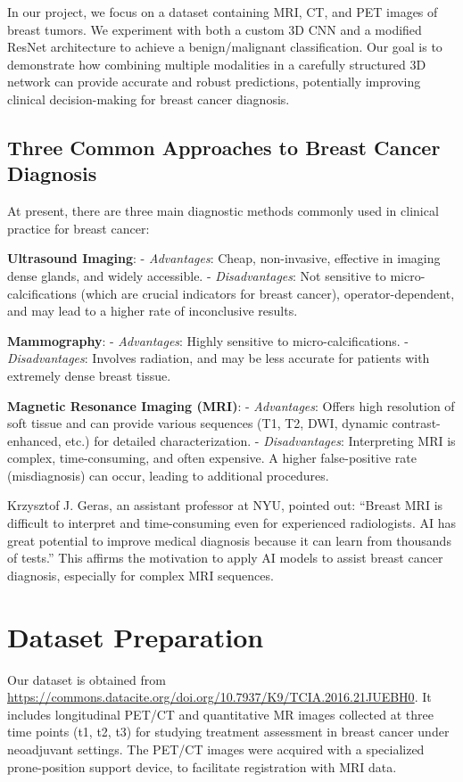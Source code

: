 \documentclass{article}
\begin{document}
In our project, we focus on a dataset containing MRI, CT, and PET images of breast tumors. We experiment with both a custom 3D CNN and a modified ResNet architecture to achieve a benign/malignant classification. Our goal is to demonstrate how combining multiple modalities in a carefully structured 3D network can provide accurate and robust predictions, potentially improving clinical decision-making for breast cancer diagnosis.

\subsection{Three Common Approaches to Breast Cancer Diagnosis}
At present, there are three main diagnostic methods commonly used in clinical practice for breast cancer:

\textbf{Ultrasound Imaging}:  
- \textit{Advantages}: Cheap, non-invasive, effective in imaging dense glands, and widely accessible.  
- \textit{Disadvantages}: Not sensitive to micro-calcifications (which are crucial indicators for breast cancer), operator-dependent, and may lead to a higher rate of inconclusive results.

\textbf{Mammography}:  
- \textit{Advantages}: Highly sensitive to micro-calcifications.  
- \textit{Disadvantages}: Involves radiation, and may be less accurate for patients with extremely dense breast tissue.

\textbf{Magnetic Resonance Imaging (MRI)}:  
- \textit{Advantages}: Offers high resolution of soft tissue and can provide various sequences (T1, T2, DWI, dynamic contrast-enhanced, etc.) for detailed characterization.  
- \textit{Disadvantages}: Interpreting MRI is complex, time-consuming, and often expensive. A higher false-positive rate (misdiagnosis) can occur, leading to additional procedures.

Krzysztof J. Geras, an assistant professor at NYU, pointed out: “Breast MRI is difficult to interpret and time-consuming even for experienced radiologists. AI has great potential to improve medical diagnosis because it can learn from thousands of tests.” This affirms the motivation to apply AI models to assist breast cancer diagnosis, especially for complex MRI sequences.

\section{Dataset Preparation}
Our dataset is obtained from \url{https://commons.datacite.org/doi.org/10.7937/K9/TCIA.2016.21JUEBH0}. It includes longitudinal PET/CT and quantitative MR images collected at three time points (t1, t2, t3) for studying treatment assessment in breast cancer under neoadjuvant settings. The PET/CT images were acquired with a specialized prone-position support device, to facilitate registration with MRI data. 
\end{document}
